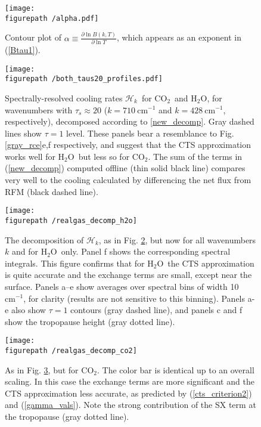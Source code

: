 \documentclass{ametsoc}
\newcommand{\eqnref}[1]{(\ref{#1})}
\newcommand{\cminverse}{\ensuremath{\mathrm{cm^{-1}}}}
\newcommand{\partialder}[2]{\ensuremath{\frac{\partial #1}{\partial #2}}}
\newcommand{\cotwo}{\ensuremath{\mathrm{CO_2}}}
\newcommand{\htwo}{\ensuremath{\mathrm{H_2O}}}
\newcommand{\ch}{\ensuremath{\mathcal{H}}}
\newcommand{\chk}{\ensuremath{\ch_k}}
\newcommand{\taus}{\ensuremath{\tau_s}}
\newcommand{\figurepath}{./}
\begin{document}
\begin{figure}[h]
	\begin{center}
			\texttt{[image: \\figurepath /alpha.pdf]}
		\caption{Contour plot of $\alpha \equiv \partialder{\ln B(k,T)}{\ln T}$, which appears as an exponent in \eqnref{Btau1}.  
		\label{alpha}
		}
	\end{center}
\end{figure}

\begin{figure}[h]
	\begin{center}
			\texttt{[image: \\figurepath /both\_taus20\_profiles.pdf]}
		\caption{Spectrally-resolved cooling rates \chk\ for \cotwo\  and \htwo, for  wavenumbers with $\taus\approx20$ ($k=710\ \cminverse$ and $k=428\ \cminverse$, respectively), decomposed according to  \eqref{new_decomp}. Gray dashed lines show $\tau=1$ level. These panels bear a resemblance to Fig. \ref{gray_rce}e,f respectively, and suggest that the  CTS approximation works well for \htwo\ but less so for \cotwo. The sum of the terms in \eqnref{new_decomp} computed offline (thin solid black line) compares very well to the cooling calculated by differencing the net flux  from RFM (black dashed line).
		\label{both_taus20_profiles}
		}
	\end{center}
\end{figure}


\begin{figure}[h]
	\begin{center}
			\texttt{[image: \\figurepath /realgas\_decomp\_h2o]}
		\caption{ The decomposition of \chk, as in Fig. \ref{both_taus20_profiles}, but now for all wavenumbers $k$ and for \htwo\ only. Panel f shows the corresponding spectral integrals.  This figure confirms that for \htwo\ the CTS approximation is quite accurate and the exchange terms are small, except near the surface.  Panels a--e show averages over spectral bins of width 10 \cminverse, for clarity (results are not sensitive to this binning). Panels a-e also show $\tau=1$ contours (gray dashed line), and panels c and f show the tropopause height (gray dotted line).
		\label{realgas_decomp_h2o}
		}
	\end{center}
\end{figure}

\begin{figure}[h]
	\begin{center}
			\texttt{[image: \\figurepath /realgas\_decomp\_co2]}
		\caption{As in Fig. \ref{realgas_decomp_h2o}, but for \cotwo. The color bar is identical up to an overall scaling. In this case the exchange terms are more significant and the CTS approximation less accurate, as predicted by \eqnref{cts_criterion2} and \eqnref{gamma_vals}. Note the strong contribution of the SX term at the tropopause (gray dotted line). 
				\label{realgas_decomp_co2}
		}
	\end{center}
\end{figure}
\end{document}
